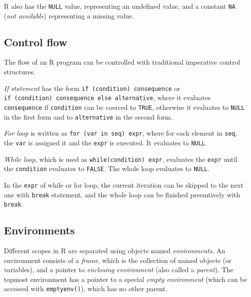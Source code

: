 R also has the \texttt{NULL} value, representing an undefined value, and a constant \texttt{NA} (\textit{not available}) representing a missing value.


\subsection*{Control flow}

The flow of an R program can be controlled with traditional imperative control structures.

\textit{If statement} has the form \texttt{if (condition) consequence} or \\ \texttt{if (condition) consequence else alternative}, where it evaluates \texttt{consequence} if \texttt{condition} can be coerced to \texttt{TRUE}, otherwise it evaluates to \texttt{NULL} in the first form and to \texttt{alternative} in the second form.

\textit{For loop} is written as \texttt{for (var in seq) expr}, where for each element in \texttt{seq}, the \texttt{var} is assigned it and the \texttt{expr} is executed. It evaluates to \texttt{NULL}.

\textit{While loop}, which is used as \texttt{while(condition) expr}, evaluates the \texttt{expr} until the \texttt{condition} evaluates to \texttt{FALSE}. The whole loop evaluates to \texttt{NULL}.

In the \texttt{expr} of while or for loop, the current iteration can be skipped to the next one with \texttt{break} statement, and the whole loop can be finished preemtively with \texttt{break}.

\subsection*{Environments}

Different scopes in R are separated using objects named \textit{environments}. An environment consists of a \textit{frame}, which is the collection of named objects (or variables), and a pointer to \textit{enclosing environment} (also called a \textit{parent}). The topmost environment has a pointer to a special \textit{empty environment} (which can be accessed with \texttt{emptyenv()}), which has no other parent.

